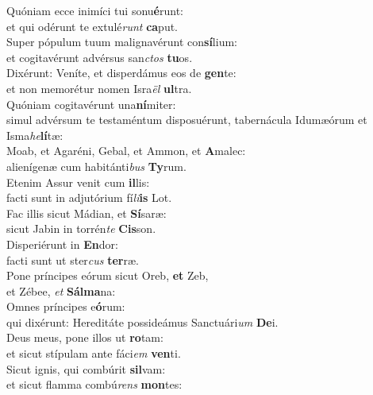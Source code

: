 \evenverse Quóniam ecce inimíci tui sonu\textbf{é}runt:~\*\\
\evenverse et qui odérunt te extulé\textit{runt} \textbf{ca}put.\\
\oddverse Super pópulum tuum malignavérunt con\textbf{sí}lium:~\*\\
\oddverse et cogitavérunt advérsus san\textit{ctos} \textbf{tu}os.\\
\evenverse Dixérunt: Veníte, et disperdámus eos de \textbf{gen}te:~\*\\
\evenverse et non memorétur nomen Isra\textit{ël} \textbf{ul}tra.\\
\oddverse Quóniam cogitavérunt una\textbf{ní}miter:~\*\\
\oddverse simul advérsum te testaméntum disposuérunt, tabernácula Idumæórum et Isma\textit{he}\textbf{lí}tæ:\\
\evenverse Moab, et Agaréni, Gebal, et Ammon, et \textbf{A}malec:~\*\\
\evenverse alienígenæ cum habitánti\textit{bus} \textbf{Ty}rum.\\
\oddverse Etenim Assur venit cum \textbf{il}lis:~\*\\
\oddverse facti sunt in adjutórium fí\textit{li}\textbf{is} Lot.\\
\evenverse Fac illis sicut Mádian, et \textbf{Sí}saræ:~\*\\
\evenverse sicut Jabin in torrén\textit{te} \textbf{Cis}son.\\
\oddverse Disperiérunt in \textbf{En}dor:~\*\\
\oddverse facti sunt ut ster\textit{cus} \textbf{ter}ræ.\\
\evenverse Pone príncipes eórum sicut Oreb, \textbf{et} Zeb,~\*\\
\evenverse et Zébee, \textit{et} \textbf{Sál}\textbf{ma}na:\\
\oddverse Omnes príncipes e\textbf{ó}rum:~\*\\
\oddverse qui dixérunt: Hereditáte possideámus Sanctuári\textit{um} \textbf{De}i.\\
\evenverse Deus meus, pone illos ut \textbf{ro}tam:~\*\\
\evenverse et sicut stípulam ante fáci\textit{em} \textbf{ven}ti.\\
\oddverse Sicut ignis, qui combúrit \textbf{sil}vam:~\*\\
\oddverse et sicut flamma combú\textit{rens} \textbf{mon}tes:\\
